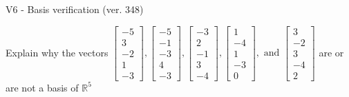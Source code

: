 \begin{exercise}
  \begin{exerciseTitle}V6 - Basis verification (ver. 348)\end{exerciseTitle}
  \begin{exerciseStatement}
    Explain why the vectors \(\left[\begin{array}{r}
-5 \\
3 \\
-2 \\
1 \\
-3
\end{array}\right] , \left[\begin{array}{r}
-5 \\
-1 \\
-3 \\
4 \\
-3
\end{array}\right] , \left[\begin{array}{r}
-3 \\
2 \\
-1 \\
3 \\
-4
\end{array}\right] , \left[\begin{array}{r}
1 \\
-4 \\
1 \\
-3 \\
0
\end{array}\right] , \text{ and } \left[\begin{array}{r}
3 \\
-2 \\
3 \\
-4 \\
2
\end{array}\right]\) are or are not a basis of \(\mathbb{R}^5\)	



\end{exerciseStatement}
\end{exercise}
